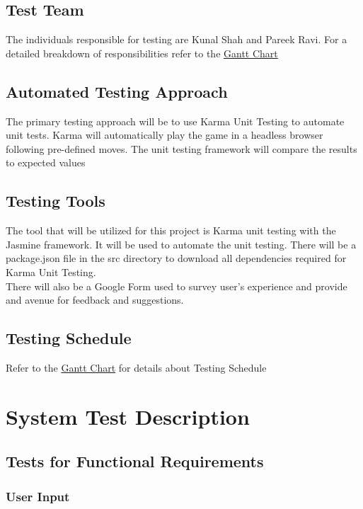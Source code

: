\documentclass[12pt, titlepage]{article}
\begin{document}
\subsection{Test Team}
The individuals responsible for testing are Kunal Shah and Pareek Ravi. For a
detailed breakdown of responsibilities refer to the
\href{run:../../ProjectSchedule/Gantt Chart.gan}{Gantt Chart}

\subsection{Automated Testing Approach}
The primary testing approach will be to use Karma Unit Testing to automate unit
tests. Karma will automatically play the game in a headless browser following
pre-defined moves. The unit testing framework will compare the results to
expected values

\subsection{Testing Tools}
The tool that will be utilized for this project is Karma unit testing with the
Jasmine framework. It will be used to automate the unit testing. There will be a
package.json file in the src directory to download all dependencies required for
Karma Unit Testing.\\
There will also be a Google Form used to survey user's experience and provide
and avenue for feedback and suggestions.

\subsection{Testing Schedule}	
Refer to the \href{run:../../ProjectSchedule/Gantt Chart.gan}{Gantt Chart} for
details about Testing Schedule

\section{System Test Description}
	
\subsection{Tests for Functional Requirements}

\subsubsection{User Input}
\end{document}
